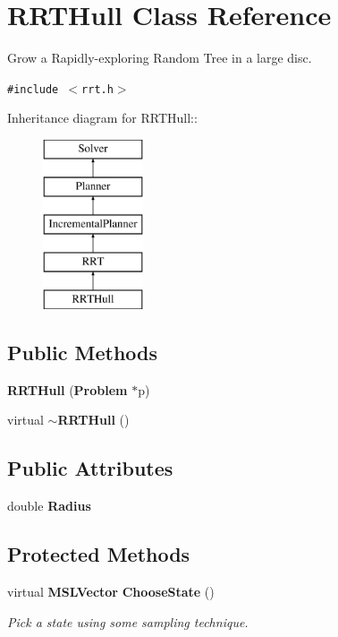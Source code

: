 \section{RRTHull  Class Reference}
\label{class_RRTHull}
Grow a Rapidly-exploring Random Tree in a large disc. 


{\tt \#include $<$rrt.h$>$}

Inheritance diagram for RRTHull::\begin{figure}[H]
\begin{center}
\leavevmode
\includegraphics[height=5cm]{class_RRTHull}
\end{center}
\end{figure}
\subsection*{Public Methods}
\begin{CompactItemize}
\item 
{\bf RRTHull} ({\bf Problem} $\ast$p)
\item 
virtual {\bf $\sim$RRTHull} ()
\end{CompactItemize}
\subsection*{Public Attributes}
\begin{CompactItemize}
\item 
double {\bf Radius}
\end{CompactItemize}
\subsection*{Protected Methods}
\begin{CompactItemize}
\item 
virtual {\bf MSLVector} {\bf Choose\-State} ()
\begin{CompactList}\small\item\em Pick a state using some sampling technique.\item\end{CompactList}\end{CompactItemize}


